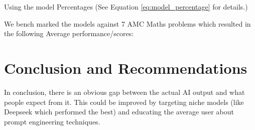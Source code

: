 \documentclass{article}
\begin{document}
Using the model Percentages (See Equation \ref{eq:model_percentage} for details.)

We bench marked the models against 7 AMC Maths problems which resulted in the following Average performance/scores:

\begin{table}[h!]
\centering
\caption{Model Rankings \& Categorization}
\label{tab:model_rankings}
\end{table}





\section{Conclusion and Recommendations}
In conclusion, there is an obvious gap between the actual AI output and what people expect from it. This could be improved by targeting niche models (like Deepseek which performed the best) and educating the average user about prompt engineering techniques.




\end{document}
